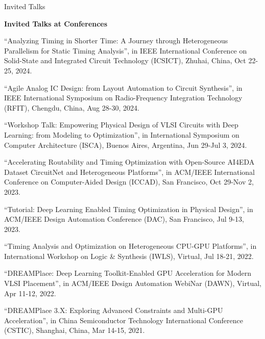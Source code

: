 \begin{rSection}{Invited Talks}

\textbf{Invited Talks at Conferences}
        
\begin{description}[font=\normalfont]

\item[{[11]}]{
``Analyzing Timing in Shorter Time: A Journey through Heterogeneous Parallelism for Static Timing Analysis'', in IEEE International Conference on Solid-State and Integrated Circuit Technology (ICSICT), Zhuhai, China, Oct 22-25, 2024. 
}

\item[{[10]}]{
``Agile Analog IC Design: from Layout Automation to Circuit Synthesis'', in IEEE International Symposium on Radio-Frequency Integration Technology (RFIT), Chengdu, China, Aug 28-30, 2024. 
}

\item[{[9]}]{
``Workshop Talk: Empowering Physical Design of VLSI Circuits with Deep Learning: from Modeling to Optimization'', in International Symposium on Computer Architecture (ISCA), Buenos Aires, Argentina, Jun 29-Jul 3, 2024. 
}

\item[{[8]}]{
``Accelerating Routability and Timing Optimization with Open-Source AI4EDA Dataset CircuitNet and Heterogeneous Platforms'', in ACM/IEEE International Conference on Computer-Aided Design (ICCAD), San Francisco, Oct 29-Nov 2, 2023. 
}

\item[{[7]}]{
``Tutorial: Deep Learning Enabled Timing Optimization in Physical Design'', in ACM/IEEE Design Automation Conference (DAC), San Francisco, Jul 9-13, 2023. 
}

\item[{[6]}]{
``Timing Analysis and Optimization on Heterogeneous CPU-GPU Platforms'', in International Workshop on Logic \& Synthesis (IWLS), Virtual, Jul 18-21, 2022. 
}

\item[{[5]}]{
``DREAMPlace: Deep Learning Toolkit-Enabled GPU Acceleration for Modern VLSI Placement'', in ACM/IEEE Design Automation WebiNar (DAWN), Virtual, Apr 11-12, 2022. 
}

\item[{[4]}]{
``DREAMPlace 3.X: Exploring Advanced Constraints and Multi-GPU Acceleration'', in China Semiconductor Technology International Conference (CSTIC), Shanghai, China, Mar 14-15, 2021. 
}


\end{description}
\end{rSection}
